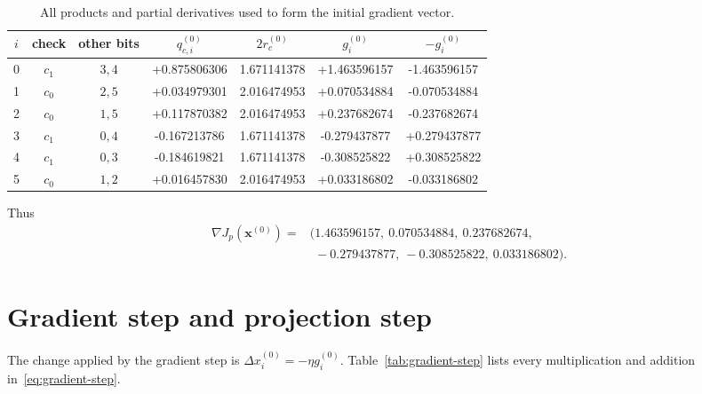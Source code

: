 \documentclass[11pt]{article}
\begin{document}
\begin{table}[H]
\centering
\scriptsize
\caption{All products and partial derivatives used to form the initial gradient vector.}
\label{tab:gradient}
\setlength{\tabcolsep}{4.6pt}
\begin{tabular}{c c c
  S[table-format=+1.9]
  S[table-format=1.9]
  S[table-format=+1.9]
  S[table-format=+1.9]}
\toprule
{$i$} & {check} & {other bits} & {$q_{c,i}^{(0)}$} & {$2r_c^{(0)}$}
& {$g_i^{(0)}$} & {$-g_i^{(0)}$} \\
 & $c_1$ & $3,4$ & +0.875806306 & 1.671141378 & +1.463596157 & -1.463596157 \\
1 & $c_0$ & $2,5$ & +0.034979301 & 2.016474953 & +0.070534884 & -0.070534884 \\
2 & $c_0$ & $1,5$ & +0.117870382 & 2.016474953 & +0.237682674 & -0.237682674 \\
3 & $c_1$ & $0,4$ & -0.167213786 & 1.671141378 & -0.279437877 & +0.279437877 \\
4 & $c_1$ & $0,3$ & -0.184619821 & 1.671141378 & -0.308525822 & +0.308525822 \\
5 & $c_0$ & $1,2$ & +0.016457830 & 2.016474953 & +0.033186802 & -0.033186802 \\
\bottomrule
\end{tabular}
\end{table}

Thus
\begin{align}
\nabla J_p(\boldsymbol{x}^{(0)})={}&
(1.463596157,\ 0.070534884,\ 0.237682674,\nonumber\\
&\phantom{(}-0.279437877,\ -0.308525822,\ 0.033186802).
\label{eq:g0}
\end{align}

\section{Gradient step and projection step}

The change applied by the gradient step is
\(\Delta x_i^{(0)}=-\eta g_i^{(0)}\).  Table~\ref{tab:gradient-step}
lists every multiplication and addition in~\eqref{eq:gradient-step}.
\end{document}
